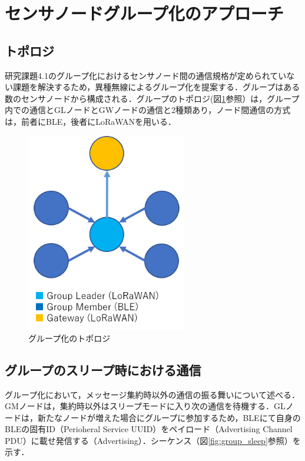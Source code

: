 \section{センサノードグループ化のアプローチ}

\subsection{トポロジ}
研究課題4.1のグループ化におけるセンサノード間の通信規格が定められていない課題を解決するため，異種無線によるグループ化を提案する．グループはある数のセンサノードから構成される．グループのトポロジ(図\ref{fig:group_topology}参照）は，グループ内での通信とGLノードとGWノードの通信と2種類あり，ノード間通信の方式は，前者にBLE，後者にLoRaWANを用いる．

\begin{figure}[]
    \begin{center}
    \includegraphics[width=7cm]{figures/v2.0/トポロジ.png}
    \caption{グループ化のトポロジ}
    \label{fig:group_topology}
    \end{center}
\end{figure}

\subsection{グループのスリープ時における通信}
グループ化において，メッセージ集約時以外の通信の振る舞いについて述べる．GMノードは，集約時以外はスリープモードに入り次の通信を待機する．GLノードは，新たなノードが増えた場合にグループに参加するため，BLEにて自身のBLEの固有ID（Perioheral Service UUID）をペイロード（Advertising Channel PDU）に載せ発信する（Advertising）．シーケンス（図\ref{fig:group_sleep}参照）を示す．

